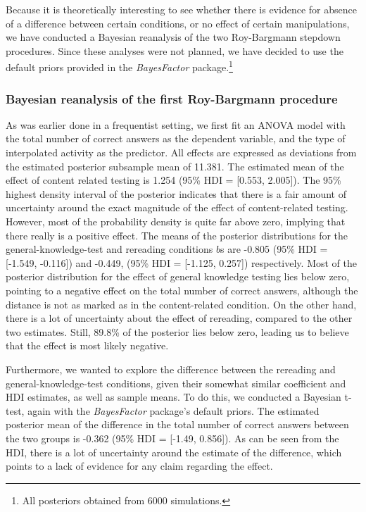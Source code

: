 \documentclass[../main.tex]{subfiles}
\begin{document}
Because it is theoretically interesting to see whether there is evidence
for absence of a difference between certain conditions, or no effect of
certain manipulations, we have conducted a Bayesian reanalysis of the
two Roy-Bargmann stepdown procedures. Since these analyses were not
planned, we have decided to use the default priors provided in the
\textit{BayesFactor} \citep{moreyBayesFactorComputationBayes2018}
package.\footnote{All posteriors obtained from 6000 simulations.}

\hypertarget{bayesian-reanalysis-of-the-first-roy-bargmann-procedure}{%
\subsubsection{Bayesian reanalysis of the first Roy-Bargmann
procedure}\label{bayesian-reanalysis-of-the-first-roy-bargmann-procedure}}

As was earlier done in a frequentist setting, we first fit an ANOVA
model with the total number of correct answers as the dependent
variable, and the type of interpolated activity as the predictor. All
effects are expressed as deviations from the estimated posterior
subsample mean of 11.381. The estimated mean of the effect of content
related testing is 1.254 (95\% HDI = {[}0.553, 2.005{]}). The 95\%
highest density interval of the posterior indicates that there is a fair
amount of uncertainty around the exact magnitude of the effect of
content-related testing. However, most of the probability density is
quite far above zero, implying that there really is a positive effect.
The means of the posterior distributions for the general-knowledge-test
and rereading conditions \(b\)s are -0.805 (95\% HDI = {[}-1.549,
-0.116{]}) and -0.449, (95\% HDI = {[}-1.125, 0.257{]}) respectively.
Most of the posterior distribution for the effect of general knowledge
testing lies below zero, pointing to a negative effect on the total
number of correct answers, although the distance is not as marked as in
the content-related condition. On the other hand, there is a lot of
uncertainty about the effect of rereading, compared to the other two
estimates. Still, 89.8\% of the posterior lies below zero, leading us to
believe that the effect is most likely negative.

Furthermore, we wanted to explore the difference between the rereading
and general-knowledge-test conditions, given their somewhat similar
coefficient and HDI estimates, as well as sample means. To do this, we
conducted a Bayesian t-test, again with the \textit{BayesFactor}
package's default priors. The estimated posterior mean of the difference
in the total number of correct answers between the two groups is -0.362
(95\% HDI = {[}-1.49, 0.856{]}). As can be seen from the HDI, there is a
lot of uncertainty around the estimate of the difference, which points
to a lack of evidence for any claim regarding the effect.
\end{document}
